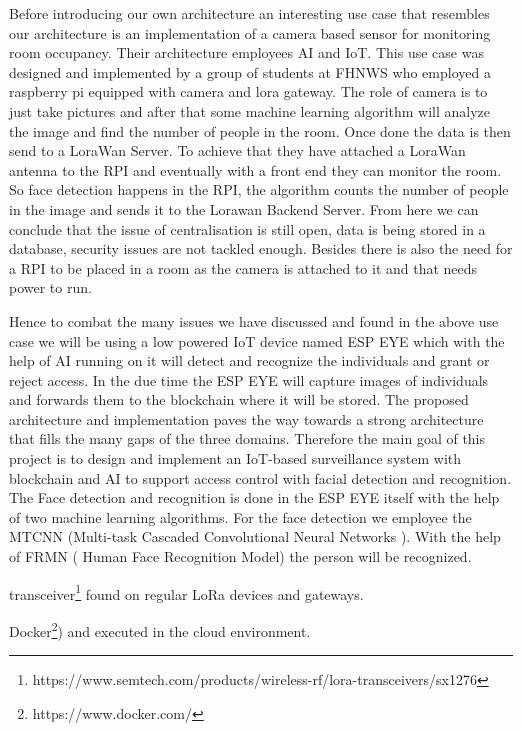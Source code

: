 Before introducing our own architecture an interesting use case that resembles  our architecture is an implementation of a camera based sensor for monitoring room occupancy. Their architecture employees AI and IoT. This use case was designed and implemented by a group of students at FHNWS who employed a raspberry pi equipped with camera and lora gateway. The role of camera is to just take pictures and after that some machine learning algorithm will analyze the image and find the number of people in the room. Once done the data is then send to a LoraWan Server. To achieve that they have attached a LoraWan antenna to the RPI and eventually with a front end they can monitor the room. So face detection happens in the RPI, the algorithm counts the number of people in the image and sends it to the Lorawan Backend Server. From here we can conclude that the issue of centralisation is still open, data is being stored in a database, security issues are not tackled enough. Besides there is also the need for a RPI to be placed in a room as the camera is attached to it and that needs power to run.

Hence to combat the many issues we have discussed and found in the above use case we will be using a low powered IoT device named ESP EYE which with the help of AI running on it will detect and recognize the individuals and grant or reject access. In the due time the ESP EYE will capture images of individuals and forwards them to the blockchain where it will be stored. The proposed architecture and implementation paves the way towards a strong architecture that fills the many gaps of the three domains. Therefore the main goal of this project is to design and implement an IoT-based surveillance system with blockchain and AI to support access control with facial detection and recognition. 
The Face detection and recognition is done in the ESP EYE itself with the help of two machine learning algorithms. For the face detection we employee the MTCNN (Multi-task Cascaded Convolutional Neural Networks ). With the help of FRMN ( Human Face Recognition Model) the person will be recognized. 




 transceiver\footnote{https://www.semtech.com/products/wireless-rf/lora-transceivers/sx1276} found on regular LoRa devices and gateways. 


 Docker\footnote{https://www.docker.com/}) and executed in the cloud environment. 

